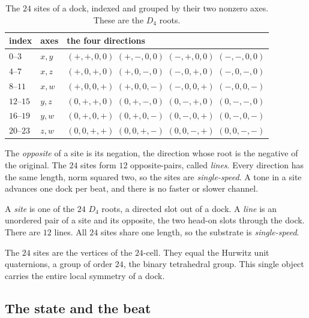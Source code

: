 \begin{table}[ht]
\centering
\begin{tabular}{@{}lll@{}}
\toprule
index & axes & the four directions \\
\midrule
$0$--$3$ & $x, y$ & $(+,+,0,0)$ \quad $(+,-,0,0)$ \quad $(-,+,0,0)$ \quad $(-,-,0,0)$ \\
$4$--$7$ & $x, z$ & $(+,0,+,0)$ \quad $(+,0,-,0)$ \quad $(-,0,+,0)$ \quad $(-,0,-,0)$ \\
$8$--$11$ & $x, w$ & $(+,0,0,+)$ \quad $(+,0,0,-)$ \quad $(-,0,0,+)$ \quad $(-,0,0,-)$ \\
$12$--$15$ & $y, z$ & $(0,+,+,0)$ \quad $(0,+,-,0)$ \quad $(0,-,+,0)$ \quad $(0,-,-,0)$ \\
$16$--$19$ & $y, w$ & $(0,+,0,+)$ \quad $(0,+,0,-)$ \quad $(0,-,0,+)$ \quad $(0,-,0,-)$ \\
$20$--$23$ & $z, w$ & $(0,0,+,+)$ \quad $(0,0,+,-)$ \quad $(0,0,-,+)$ \quad $(0,0,-,-)$ \\
\bottomrule
\end{tabular}
\caption{The $24$ sites of a dock, indexed and grouped by their two nonzero axes. These are the $D_4$ roots.}
\label{tab:sites-d4}
\end{table}

The \emph{opposite} of a site is its negation, the direction whose root is the negative of the original. The $24$ sites form $12$ opposite-pairs, called \emph{lines}. Every direction has the same length, norm squared two, so the sites are \emph{single-speed}. A tone in a site advances one dock per beat, and there is no faster or slower channel.

\begin{definition}
A \emph{site} is one of the $24$ $D_4$ roots, a directed slot out of a dock. A \emph{line} is an unordered pair of a site and its opposite, the two head-on slots through the dock. There are $12$ lines. All $24$ sites share one length, so the substrate is \emph{single-speed}.
\end{definition}

\begin{result}
The $24$ sites are the vertices of the $24$-cell. They equal the Hurwitz unit quaternions, a group of order $24$, the binary tetrahedral group. This single object carries the entire local symmetry of a dock.
\end{result}

\subsection{The state and the beat}

